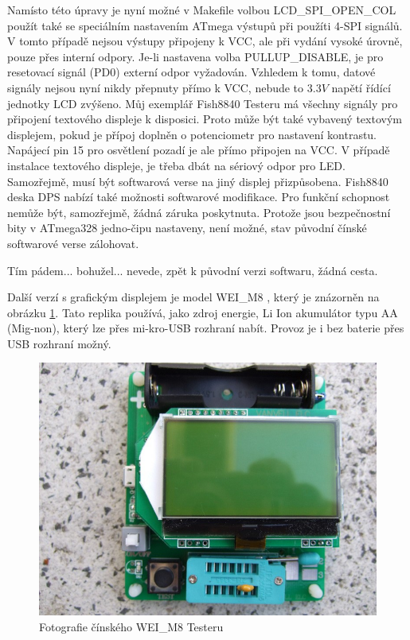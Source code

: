 Namísto této úpravy je nyní možné v Makefile volbou LCD\_SPI\_OPEN\_COL použít také se speciálním nastavením
ATmega výstupů při použíti 4-SPI signálů.
V tomto případě nejsou výstupy připojeny k VCC, ale při vydání vysoké úrovně, pouze přes
interní  odpory.
Je-li nastavena volba PULLUP\_DISABLE, je pro resetovací signál (PD0) externí  odpor vyžadován.
Vzhledem k tomu, datové signály nejsou nyní nikdy přepnuty přímo k VCC, nebude to  \(3.3V\)
napětí řídící jednotky LCD zvýšeno.
Můj exemplář Fish8840 Testeru má všechny signály pro připojení textového displeje k disposici. 
Proto může být také vybavený textovým displejem, pokud je přípoj doplněn o potenciometr pro nastavení kontrastu.
Napájecí pin 15 pro osvětlení pozadí je ale přímo připojen na VCC.
V případě instalace textového displeje, je třeba dbát na sériový odpor pro LED.
Samozřejmě, musí být softwarová verse na jiný displej přizpůsobena.
Fish8840 deska DPS nabízí také možnosti softwarové modifikace.
Pro funkční schopnost nemůže být, samozřejmě, žádná záruka poskytnuta.
Protože jsou bezpečnostní bity v ATmega328 jedno-čipu nastaveny, není možné,
stav původní čínské softwarové verse zálohovat.

Tím pádem... bohužel... nevede, zpět k původní verzi softwaru, žádná cesta.


Další verzí s grafickým displejem je model WEI\_M8 , který je znázorněn na obrázku \ref{fig:WeiM8}.
Tato replika používá, jako zdroj energie, Li Ion akumulátor typu AA (Mig-non), který lze přes
mi-kro-USB rozhraní nabít. Provoz je i bez baterie přes USB rozhraní možný.

\begin{figure}[H]
\centering
\includegraphics[width=.7\textwidth]{../PNG/WEI_M8.JPG}
\caption{Fotografie čínského WEI\_M8 Testeru}
\label{fig:WeiM8}
\end{figure}

